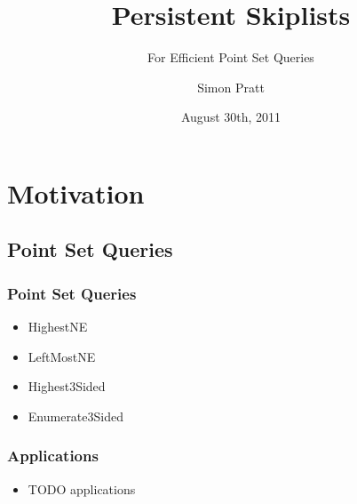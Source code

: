 \documentclass{beamer}
\title{Persistent Skiplists}
\subtitle{For Efficient Point Set Queries}
\author{Simon Pratt}
\institute[Carleton University]
{
  Carleton University
}
\date{August 30th, 2011}
\begin{document}
\begin{frame}
  \titlepage
\end{frame}




\section{Motivation}

\subsection{Point Set Queries}

\begin{frame}
  \frametitle{Point Set Queries}

  \begin{itemize}
  \item
    HighestNE
  \item
    LeftMostNE
  \item
    Highest3Sided
  \item
    Enumerate3Sided
  \end{itemize}
\end{frame}

\begin{frame}
  \frametitle{Applications}

  \begin{itemize}
  \item
    TODO applications
  \end{itemize}
\end{frame}
\end{document}
